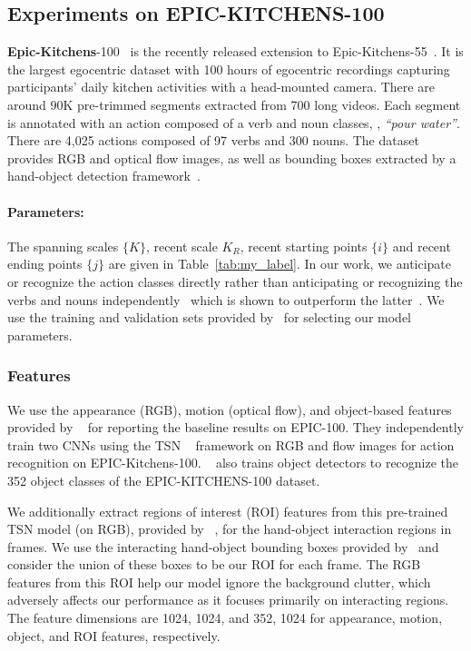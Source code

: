 \documentclass[10pt,twocolumn,letterpaper]{article}
\begin{document}
\subsection{Experiments on EPIC-KITCHENS-100}
\textbf{Epic-Kitchens}-100~\cite{damen2020rescaling} is the recently released extension to Epic-Kitchens-55~\cite{damen2018scaling}.
It is the largest egocentric dataset with 100 hours of egocentric recordings capturing participants' daily kitchen activities with a head-mounted camera. 
There are around $90$K pre-trimmed segments extracted from 700 long videos. Each segment is annotated with an action composed of a verb and noun classes, \eg, \emph{``pour water''}. 
There are 4,025 actions composed of 97 verbs and 300 nouns. 
The dataset provides RGB and optical flow images, as well as bounding boxes extracted by a hand-object detection framework~\cite{shan2020understanding}.


\paragraph{Parameters:} The spanning scales $\{K\}$, recent scale $K_R$, recent starting points $\{i\}$ and recent ending points $\{j\}$ are given in Table~\ref{tab:my_label}.
In our work, we anticipate or recognize the action classes directly rather than anticipating or recognizing the verbs and nouns independently~\cite{damen2018scaling} which is shown to outperform the latter~\cite{furnari2018leveraging}.
We use the training and validation sets provided by~\cite{damen2020rescaling} for selecting our model parameters.


\subsubsection{Features}
We use the appearance (RGB), motion (optical flow), and object-based features provided by ~\cite{furnari2019rulstm} for reporting the baseline results on EPIC-100.
They independently train two CNNs using the TSN ~\cite{wang2016temporal} framework on RGB and flow images for action recognition on EPIC-Kitchens-100. 
~\cite{furnari2019rulstm} also trains object detectors to recognize the 352 object classes of the EPIC-KITCHENS-100 dataset. 


We additionally extract regions of interest (ROI) features from this pre-trained TSN model (on RGB), provided by ~\cite{furnari2019rulstm}, for the hand-object interaction regions in frames. 
We use the interacting hand-object bounding boxes provided by~\cite{shan2020understanding} and consider the union of these boxes to be our ROI for each frame.
The RGB features from this ROI help our model ignore the background clutter, which adversely affects our performance as it focuses primarily on interacting regions.
The feature dimensions are 1024, 1024, and 352, 1024 for appearance, motion, object, and ROI features, respectively. 
\end{document}
